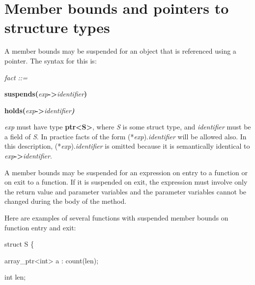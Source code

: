 \documentclass[]{article}
\begin{document}
\section{\texorpdfstring{\protect\hypertarget{ux5fRef420421813}{}{\protect\hypertarget{ux5fRef420422555}{}{\protect\hypertarget{ux5fToc420589207}{}{\protect\hypertarget{ux5fToc422906998}{}{\protect\hypertarget{ux5fToc424307727}{}{\protect\hypertarget{ux5fToc426641104}{}{\protect\hypertarget{ux5fToc435434986}{}{\protect\hypertarget{ux5fToc437460819}{}{\protect\hypertarget{ux5fToc440445500}{}{\protect\hypertarget{ux5fToc440449282}{}{\protect\hypertarget{ux5fToc440551932}{}{\protect\hypertarget{ux5fToc424307714}{}{\protect\hypertarget{ux5fRef416272001}{}{\protect\hypertarget{ux5fRef416272487}{}{\protect\hypertarget{ux5fToc420589186}{}{\protect\hypertarget{ux5fToc422906977}{}{\protect\hypertarget{ux5fRef416273801}{}{}}}}}}}}}}}}}}}}}Member
bounds and pointers to structure
types}{Member bounds and pointers to structure types}}\label{member-bounds-and-pointers-to-structure-types}

A member bounds may be suspended for an object that is referenced using
a pointer. The syntax for this is:

\emph{fact ::=}

\textbf{suspends(}\emph{exp}\textbf{-\textgreater{}}\emph{identifier}\textbf{)}

\textbf{holds(}\emph{exp}\textbf{-\textgreater{}}\emph{identifier\textbf{)}}

\emph{exp} must have type \textbf{ptr\textless{}S\textgreater{}}, where
\emph{S} is some struct type, and \emph{identifier} must be a field of
\emph{S}. In practice facts of the form (*\emph{exp}).\emph{identifier}
will be allowed also. In this description,
(*\emph{exp}).\emph{identifier} is omitted because it is semantically
identical to \emph{exp}\textbf{-\textgreater{}}\emph{identifier}.

A member bounds may be suspended for an expression on entry to a
function or on exit to a function. If it is suspended on exit, the
expression must involve only the return value and parameter variables
and the parameter variables cannot be changed during the body of the
method.

Here are examples of several functions with suspended member bounds on
function entry and exit:

struct S \{

array\_ptr\textless{}int\textgreater{} a : count(len);

int len;
\end{document}
